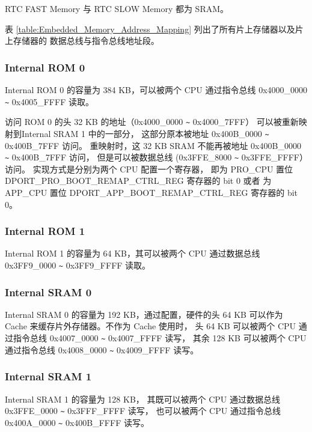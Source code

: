 \documentclass[main\_\_CN.tex]{subfiles}
\begin{document}
RTC FAST Memory 与 RTC SLOW Memory 都为 SRAM。

表 \ref{table:Embedded_Memory_Address_Mapping} 列出了所有片上存储器以及片上存储器的
数据总线与指令总线地址段。
\newpage




\subsubsection{Internal ROM 0}

Internal ROM 0 的容量为 384 KB，可以被两个 CPU 通过指令总线 0x4000\_0000 \verb+~+ 0x4005\_FFFF 读取。

\label{para:RemapInternalROM0}
\hypertarget{Remap}{}
访问 ROM 0 的头 32 KB 的地址（0x4000\_0000 \verb+~+ 0x4000\_7FFF）
可以被重新映射到Internal SRAM 1 中的一部分，
这部分原本被地址 0x400B\_0000 \verb+~+ 0x400B\_7FFF 访问。
重映射时，这 32 KB SRAM 不能再被地址 0x400B\_0000 \verb+~+ 0x400B\_7FFF 访问，
但是可以被数据总线 (0x3FFE\_8000 \verb+~+ 0x3FFE\_FFFF）访问。
实现方式是分别为两个 CPU 配置一个寄存器，
即为 PRO\_CPU 置位 DPORT\_PRO\_BOOT\_REMAP\_CTRL\_REG 寄存器的 bit 0 或者
为 APP\_CPU 置位 DPORT\_APP\_BOOT\_REMAP\_CTRL\_REG 寄存器的 bit 0。

\subsubsection{Internal ROM 1}

Internal ROM 1 的容量为 64 KB，其可以被两个 CPU 通过数据总线 0x3FF9\_0000 \verb+~+ 0x3FF9\_FFFF 读取。


\subsubsection{Internal SRAM 0}
\hypertarget{Cache}{}
Internal SRAM 0 的容量为 192 KB，通过配置，硬件的头 64 KB 可以作为 Cache 来缓存片外存储器。不作为 Cache 使用时，
头 64 KB 可以被两个 CPU 通过指令总线 0x4007\_0000 \verb+~+ 0x4007\_FFFF 读写，
其余 128 KB 可以被两个 CPU 通过指令总线 0x4008\_0000 \verb+~+ 0x4009\_FFFF 读写。


\subsubsection{Internal SRAM 1}

Internal SRAM 1 的容量为 128 KB，
其既可以被两个 CPU 通过数据总线 0x3FFE\_0000 \verb+~+ 0x3FFF\_FFFF 读写，
也可以被两个 CPU 通过指令总线 0x400A\_0000 \verb+~+ 0x400B\_FFFF 读写。
\end{document}
